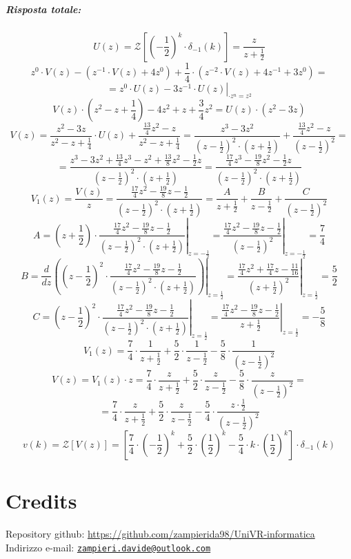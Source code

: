 \documentclass[a4paper,oneside,titlepage]{book}
\newcommand{\mail}[1]{\href{mailto:#1}{\texttt{#1}}}
\begin{document}
\paragraph{Risposta totale:}
\[ U(z) = \mathcal{Z} \left[ \left( -\frac{1}{2} \right)^k \cdot \delta_{-1}(k) \right] = \frac{z}{z+\frac{1}{2}} \]
\[ z^0 \cdot V(z) - (z^{-1} \cdot V(z) + 4 z^0) + \frac{1}{4} \cdot (z^{-2} \cdot V(z) + 4 z^{-1} + 3 z^0) = \]
\[ \left. = z^0 \cdot U(z) - 3 z^{-1} \cdot U(z) \right|_{\cdot z^n = z^2} \]
\[ V(z) \cdot \left( z^2 - z + \frac{1}{4} \right) -4z^2 + z + \frac{3}{4} z^2 = U(z) \cdot (z^2 - 3z) \]
\[ V(z) = \frac{z^2 -3z}{z^2 - z + \frac{1}{4}} \cdot U(z) + \frac{\frac{13}{4} z^2 - z}{z^2 - z + \frac{1}{4}} = \frac{z^3 -3z^2}{(z-\frac{1}{2})^2 \cdot (z+\frac{1}{2})} + \frac{\frac{13}{4} z^2 - z}{(z-\frac{1}{2})^2} = \]
\[ = \frac{z^3 -3z^2 + \frac{13}{4} z^3 - z^2 + \frac{13}{8} z^2 - \frac{1}{2} z}{(z-\frac{1}{2})^2 \cdot (z+\frac{1}{2})} = \frac{\frac{17}{4} z^3 - \frac{19}{8} z^2 - \frac{1}{2} z}{(z-\frac{1}{2})^2 \cdot (z+\frac{1}{2})} \]
\[
V_1(z) = \frac{V(z)}{z} = \frac{\frac{17}{4} z^2 - \frac{19}{8} z - \frac{1}{2}}{(z-\frac{1}{2})^2 \cdot (z+\frac{1}{2})}
= \frac{A}{z+\frac{1}{2}} + \frac{B}{z-\frac{1}{2}} + \frac{C}{(z-\frac{1}{2})^2}
\]
\newpage
\[
A = \left. \left( z+\frac{1}{2} \right) \cdot \frac{\frac{17}{4} z^2 - \frac{19}{8} z - \frac{1}{2}}{(z-\frac{1}{2})^2 \cdot (z+\frac{1}{2})} \right|_{z=-\frac{1}{2}} = \left. \frac{\frac{17}{4} z^2 - \frac{19}{8} z - \frac{1}{2}}{(z-\frac{1}{2})^2} \right|_{z=-\frac{1}{2}} = \frac{7}{4}
\]
\[
B = \frac{d}{dz} \left. \left( \left( z-\frac{1}{2} \right)^2 \cdot \frac{\frac{17}{4} z^2 - \frac{19}{8} z - \frac{1}{2}}{(z-\frac{1}{2})^2 \cdot (z+\frac{1}{2})} \right) \right|_{z=\frac{1}{2}} = \left. \frac{\frac{17}{4} z^2 + \frac{17}{4} z - \frac{11}{16}}{(z+\frac{1}{2})^2} \right|_{z=\frac{1}{2}} = \frac{5}{2}
\]
\[
C = \left. \left( z-\frac{1}{2} \right)^2 \cdot \frac{\frac{17}{4} z^2 - \frac{19}{8} z - \frac{1}{2}}{(z-\frac{1}{2})^2 \cdot (z+\frac{1}{2})} \right|_{z=\frac{1}{2}} = \left. \frac{\frac{17}{4} z^2 - \frac{19}{8} z - \frac{1}{2}}{z+\frac{1}{2}} \right|_{z=\frac{1}{2}} = -\frac{5}{8}
\]
\[ V_1(z) = \frac{7}{4} \cdot \frac{1}{z+\frac{1}{2}} + \frac{5}{2} \cdot \frac{1}{z-\frac{1}{2}} - \frac{5}{8} \cdot \frac{1}{(z-\frac{1}{2})^2} \]
\[
V(z) = V_1(z) \cdot z = \frac{7}{4} \cdot \frac{z}{z+\frac{1}{2}} + \frac{5}{2} \cdot \frac{z}{z-\frac{1}{2}} - \frac{5}{8} \cdot \frac{z}{(z-\frac{1}{2})^2} =
\]
\[
= \frac{7}{4} \cdot \frac{z}{z+\frac{1}{2}} + \frac{5}{2} \cdot \frac{z}{z-\frac{1}{2}} - \frac{5}{4} \cdot \frac{z \cdot \frac{1}{2}}{(z-\frac{1}{2})^2}
\]
\[
v(k) = \mathcal{Z} [V(z)] = \left[ \frac{7}{4} \cdot \left( -\frac{1}{2} \right)^k + \frac{5}{2} \cdot \left( \frac{1}{2} \right)^k - \frac{5}{4} \cdot k \cdot \left( \frac{1}{2} \right)^k \right] \cdot \delta_{-1}(k)
\]


\backmatter
\chapter{Credits}
Repository github: \url{https://github.com/zampierida98/UniVR-informatica} \\
Indirizzo e-mail: \mail{zampieri.davide@outlook.com}
\end{document}
